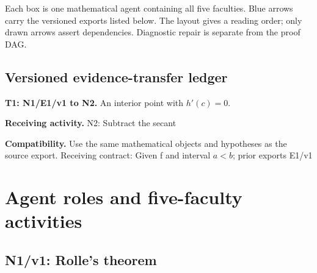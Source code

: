 \documentclass[preprint,12pt,aps,pra,showkeys,amsmath,amssymb,superscriptaddress,floatfix]{revtex4-2}
\theoremstyle{definition}
\theoremstyle{remark}
\newcommand{\field}[2]{\par\smallskip\noindent\textbf{#1.} #2\par}
\begin{document}
\begin{center}\end{center}

Each box is one mathematical agent containing all five faculties. Blue
arrows carry the versioned exports listed below. The layout gives a
reading order; only drawn arrows assert dependencies. Diagnostic repair
is separate from the proof DAG.

\subsection{Versioned evidence-transfer ledger}

\begingroup\small\linespread{1.05}\selectfont

\field{T1: N1/E1/v1 to N2}{An interior point with \(h'(c)=0\).}

\field{Receiving activity}{N2: Subtract the secant}

\field{Compatibility}{Use the same mathematical objects and hypotheses as the source export.
Receiving contract: Given f and interval \(a<b\); prior exports E1/v1}

\endgroup

\clearpage\section{Agent roles and five-faculty activities}\begingroup\small\linespread{1.05}\selectfont{}

\subsection{N1/v1: Rolle's theorem}
\end{document}
